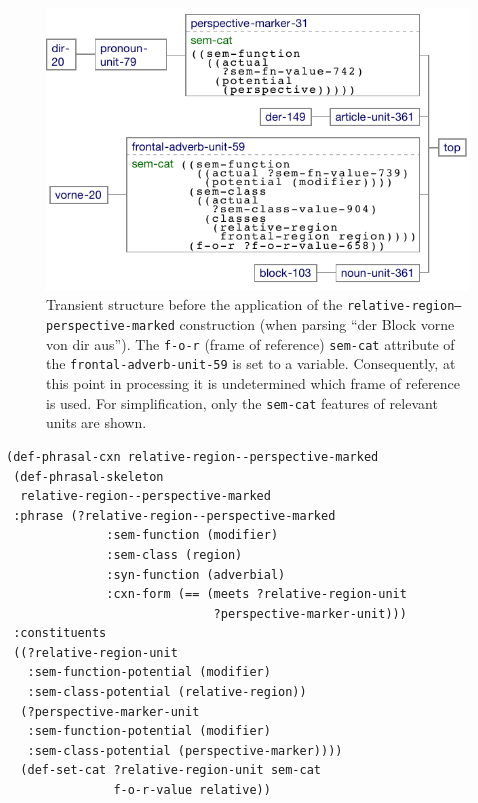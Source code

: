 \begin{figure}
\begin{center}
\includegraphics[width=0.7\columnwidth]{figs/perspective-marking-parsing-vorn-von-dir-aus-before} 

\caption[Transient structure before application]{
Transient structure before the application of 
the {\footnotesize\tt relative-region--perspective-marked} construction
(when parsing ``der Block vorne von dir aus''). The {\footnotesize\tt f-o-r} 
(frame of reference) {\footnotesize\tt sem-cat} attribute of the 
{\footnotesize\tt frontal-adverb-unit-59} is set to a variable. Consequently, 
at this point in processing it is undetermined which
frame of reference is used. For simplification, 
only the {\footnotesize\tt sem-cat} features of relevant units 
are shown.}
\label{f:setting-f-o-r-before}
\end{center}
\end{figure}

\begin{example}
\label{e:def-phrasal-relative-region-perspective-marked}
\begin{footnotesize}
\begin{Verbatim}[commandchars=\\\{\}]
(def-phrasal-cxn relative-region--perspective-marked
 (def-phrasal-skeleton 
  relative-region--perspective-marked
 :phrase (?relative-region--perspective-marked
              :sem-function (modifier)
              :sem-class (region)
              :syn-function (adverbial)
              :cxn-form (== (meets ?relative-region-unit 
                             ?perspective-marker-unit)))
 :constituents
 ((?relative-region-unit
   :sem-function-potential (modifier)
   :sem-class-potential (relative-region))
  (?perspective-marker-unit
   :sem-function-potential (modifier)
   :sem-class-potential (perspective-marker))))
  (def-set-cat ?relative-region-unit sem-cat 
               f-o-r-value relative))
\end{Verbatim}
\end{footnotesize}
\end{example}

